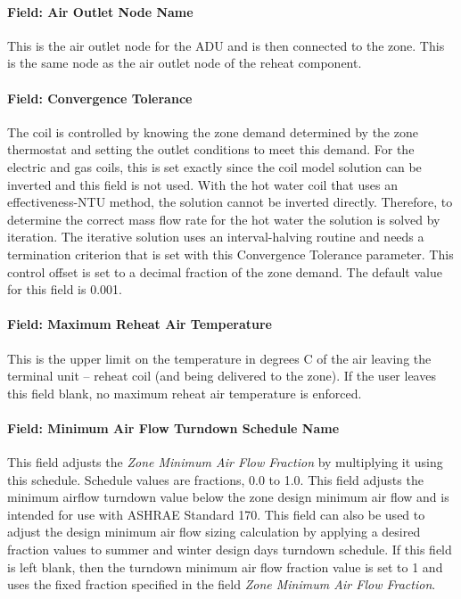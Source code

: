 \paragraph{Field: Air Outlet Node Name}\label{field-air-outlet-node-name-3}

This is the air outlet node for the ADU and is then connected to the zone. This is the same node as the air outlet node of the reheat component.

\paragraph{Field: Convergence Tolerance}\label{field-convergence-tolerance-2}

The coil is controlled by knowing the zone demand determined by the zone thermostat and setting the outlet conditions to meet this demand. For the electric and gas coils, this is set exactly since the coil model solution can be inverted and this field is not used. With the hot water coil that uses an effectiveness-NTU method, the solution cannot be inverted directly. Therefore, to determine the correct mass flow rate for the hot water the solution is solved by iteration. The iterative solution uses an interval-halving routine and needs a termination criterion that is set with this Convergence Tolerance parameter. This control offset is set to a decimal fraction of the zone demand. The default value for this field is 0.001.

\paragraph{Field: Maximum Reheat Air Temperature}\label{field-maximum-reheat-air-temperature-2}

This is the upper limit on the temperature in degrees C of the air leaving the terminal unit -- reheat coil (and being delivered to the zone). If the user leaves this field blank, no maximum reheat air temperature is enforced.

\paragraph{Field: Minimum Air Flow Turndown Schedule Name}

This field adjusts the \textit{Zone Minimum Air Flow Fraction} by multiplying it using this schedule. Schedule values are fractions, 0.0 to 1.0. This field adjusts the minimum airflow turndown value below the zone design minimum air flow and is intended for use with ASHRAE Standard 170. This field can also be used to adjust the design minimum air flow sizing calculation by applying a desired fraction values to summer and winter design days turndown schedule. If this field is left blank, then the turndown minimum air flow fraction value is set to 1 and uses the fixed fraction specified in the field \textit{Zone Minimum Air Flow Fraction}.

